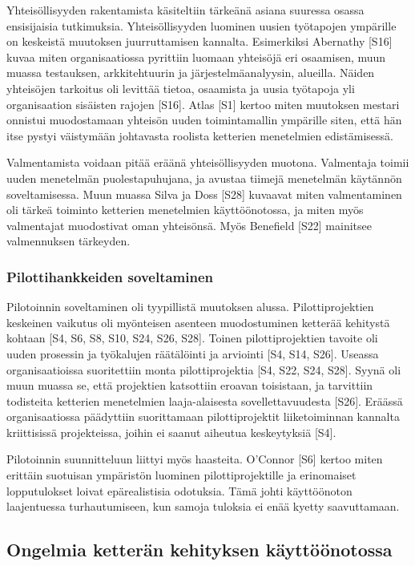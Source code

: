 Yhteisöllisyyden rakentamista käsiteltiin tärkeänä asiana suuressa osassa
ensisijaisia tutkimuksia. Yhteisöllisyyden luominen uusien työtapojen ympärille
on keskeistä muutoksen juurruttamisen kannalta. Esimerkiksi Abernathy [S16]
kuvaa miten organisaatiossa pyrittiin luomaan yhteisöjä eri osaamisen, muun
muassa testauksen, arkkitehtuurin ja järjestelmäanalyysin, alueilla.
Näiden yhteisöjen tarkoitus oli levittää tietoa, osaamista ja uusia työtapoja
yli organisaation sisäisten rajojen [S16]. Atlas [S1] kertoo miten muutoksen
mestari onnistui muodostamaan yhteisön uuden toimintamallin ympärille siten,
että hän itse pystyi väistymään johtavasta roolista ketterien menetelmien
edistämisessä.

Valmentamista voidaan pitää eräänä yhteisöllisyyden muotona. Valmentaja toimii
uuden menetelmän puolestapuhujana, ja avustaa tiimejä menetelmän käytännön
soveltamisessa. Muun muassa Silva ja Doss [S28] kuvaavat miten valmentaminen oli
tärkeä toiminto ketterien menetelmien käyttöönotossa, ja miten myös valmentajat
muodostivat oman yhteisönsä. Myös Benefield [S22] mainitsee valmennuksen
tärkeyden.

\subsubsection{Pilottihankkeiden soveltaminen}
\label{subsec:pilotointi}

Pilotoinnin soveltaminen oli tyypillistä muutoksen alussa. Pilottiprojektien
keskeinen vaikutus oli myönteisen asenteen muodostuminen ketterää kehitystä
kohtaan [S4, S6, S8, S10, S24, S26, S28]. Toinen pilottiprojektien tavoite oli
uuden prosessin ja työkalujen räätälöinti ja arviointi [S4, S14, S26].
Useassa organisaatioissa suoritettiin monta pilottiprojektia [S4, S22, S24,
S28]. Syynä oli muun muassa se, että projektien katsottiin eroavan toisistaan,
ja tarvittiin todisteita ketterien menetelmien laaja-alaisesta
sovellettavuudesta [S26]. Eräässä organisaatiossa päädyttiin suorittamaan
pilottiprojektit liiketoiminnan kannalta kriittisissä projekteissa, joihin ei
saanut aiheutua keskeytyksiä [S4].

Pilotoinnin suunnitteluun liittyi myös haasteita. O'Connor [S6] kertoo miten
erittäin suotuisan ympäristön luominen pilottiprojektille ja erinomaiset
lopputulokset loivat epärealistisia odotuksia. Tämä johti käyttöönoton
laajentuessa turhautumiseen, kun samoja tuloksia ei enää kyetty saavuttamaan.

\subsection{Ongelmia ketterän kehityksen käyttöönotossa}

